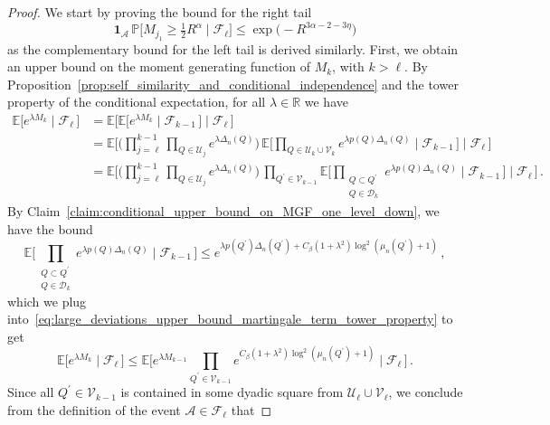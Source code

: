 \documentclass[11pt]{amsart}
\theoremstyle{definition}
\theoremstyle{remark}
\numberwithin{equation}{section}
\def\la{{\lambda}}
\newcommand{\bR}{\mathbb R}
\newcommand{\bP}{\mathbb P}
\newcommand{\bE}{\mathbb E}
\begin{document}
	\begin{proof}
		We start by proving the bound for the right tail
		\begin{equation}
			\label{eq:large_deviations_upper_bound_martingale_term_right_tail}
			\mathbf{1}_{\mathcal{A}} \, \bP\Big[ M_{j_1}  \ge \tfrac{1}{2} R^{\alpha} \mid \mathcal{F}_\ell\Big] \le \exp\Big(-R^{3\alpha -2 - 3\eta}\Big)
		\end{equation}
		as the complementary bound for the left tail is derived similarly. First, we obtain an upper bound on the moment generating function of $M_k$, with $k> \ell$. By Proposition~\ref{prop:self_similarity_and_conditional_independence} and the tower property of the conditional expectation, for all $\la\in \bR$ we have 
		\begin{align}\label{eq:large_deviations_upper_bound_martingale_term_tower_property} \nonumber
			\bE\big[e^{\la M_{k}} \mid \mathcal{F}_{\ell} \, \big] &= \bE\big[ \bE\big[e^{\la M_{k}} \mid \mathcal{F}_{k-1} \, \big] \mid \mathcal{F}_\ell \, \big] \\ \nonumber &= \bE\bigg[ \bigg(\prod_{j=\ell}^{k-1} \prod_{Q\in \mathcal{U}_j} e^{\la\Delta_n(Q)}\bigg) \, \bE\Big[ \prod_{Q\in \mathcal{U}_{k} \cup \mathcal{V}_k} e^{\la p(Q) \Delta_n(Q)}\mid \mathcal{F}_{k-1} \, \Big] \mid \mathcal{F}_{\ell} \, \bigg] \\ &= \bE\bigg[ \bigg(\prod_{j=\ell}^{k-1} \prod_{Q\in \mathcal{U}_j} e^{\la\Delta_n(Q)}\bigg) \, \prod_{Q^\prime\in \mathcal{V}_{k-1}} \bE\Big[ \prod_{\substack{Q\subset Q^\prime \\ Q\in \mathcal{D}_{k}}} e^{\la p(Q) \Delta_n(Q)}\mid \mathcal{F}_{k-1} \, \Big] \mid \mathcal{F}_{\ell} \, \bigg]  \, .
		\end{align}
		By Claim~\ref{claim:conditional_upper_bound_on_MGF_one_level_down}, we have the bound
		\[
		\bE\Big[ \prod_{\substack{Q\subset Q^\prime \\ Q\in \mathcal{D}_{k}}} e^{\la p(Q) \Delta_n(Q)}\mid \mathcal{F}_{k-1} \, \Big] \le e^{\la p(Q^\prime) \Delta_n(Q^\prime) + C_\beta(1+\la^2)\log^2(\mu_n(Q^\prime)+1)} \, ,
		\]
		which we plug into~\eqref{eq:large_deviations_upper_bound_martingale_term_tower_property} to get
		\begin{equation*}
			\bE\big[e^{\la M_{k}} \mid \mathcal{F}_{\ell} \, \big] \le \bE\Big[ e^{\la M_{k-1}}  \prod_{Q^\prime\in \mathcal{V}_{k-1}} e^{ C_\beta(1+\la^2)\log^2(\mu_n(Q^\prime)+1)} \mid \mathcal{F}_{\ell} \, \Big] \, .
		\end{equation*}
		Since all $Q^\prime\in \mathcal{V}_{k-1}$ is contained in some dyadic square from $\mathcal{U}_\ell \cup \mathcal{V}_\ell$, we conclude from the definition of the event $\mathcal{A}\in \mathcal{F}_\ell$ that 

\end{proof}
\end{document}

